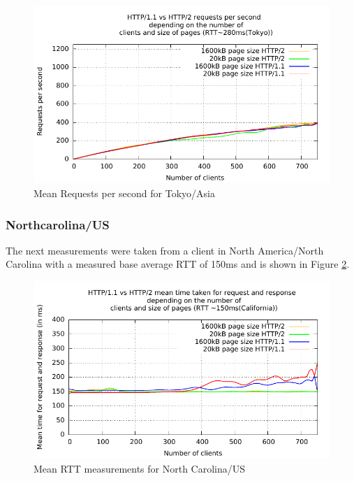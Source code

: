 \begin{figure}[H]
	\centering
	\includegraphics[scale=1,trim=0.0cm .0cm .0cm .0cm,clip]{images/reqps-asia.pdf}
	\caption{Mean Requests per second for Tokyo/Asia}
	\label{fig:reqps-asia}
\end{figure}

\subsubsection{Northcarolina/US}

The next measurements were taken from a client in North America/North Carolina with a measured base average RTT of 150ms and is shown in Figure \ref{fig:latency-na}. 

\begin{figure}[H]
	\centering
	\includegraphics[scale=1,trim=0.0cm .0cm .0cm .0cm,clip]{images/latency-na.pdf}
	\caption{Mean RTT measurements for North Carolina/US}
	\label{fig:latency-na}
\end{figure}

